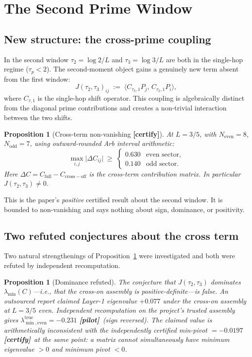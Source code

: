 \documentclass[12pt,a4paper]{amsart}
\theoremstyle{plain}
\newtheorem{proposition}[theorem]{Proposition}
\theoremstyle{definition}
\newcommand{\ltrues}[1]{\lambda_{\min,\mathrm{#1}}^{\mathrm{true}}}
\newcommand{\Jcross}{J(\tau_2,\tau_3)}
\newcommand{\certify}{\textbf{[certify]}}
\newcommand{\pilot}{\textbf{[pilot]}}
\newcommand{\ip}[2]{\langle #1,\, #2\rangle}
\begin{document}
\section{The Second Prime Window}
\label{sec:second}

\subsection{New structure: the cross-prime coupling}

In the second window $\tau_2 = \log 2/L$ and $\tau_3 = \log 3/L$ are both
in the single-hop regime ($\tau_p < 2$).  The second-moment object gains a
genuinely new term absent from the first window:
\[
  \Jcross_{ij}
  \;:=\;
  \ip{C_{\tau_3,1}P_j}{C_{\tau_2,1}P_i},
\]
where $C_{\tau,1}$ is the single-hop shift operator.  This coupling is
algebraically distinct from the diagonal prime contributions and creates
a non-trivial interaction between the two shifts.

\begin{proposition}[Cross-term non-vanishing \certify]
\label{prop:cross-nonzero}
At $L=3/5$, with $N_{\mathrm{even}}=8$, $N_{\mathrm{odd}}=7$, using
outward-rounded Arb interval arithmetic:
\[
  \max_{i,j}\lvert \Delta C_{ij}\rvert
  \;\ge\;
  \begin{cases}
    0.630 & \text{even sector},\\
    0.140 & \text{odd sector}.
  \end{cases}
\]
Here $\Delta C = C_{\mathrm{full}} - C_{\mathrm{cross-off}}$
is the cross-term contribution matrix.  In particular $\Jcross \neq 0$.
\end{proposition}

This is the paper's \emph{positive} certified result about the second window.
It is bounded to non-vanishing and says nothing about sign, dominance, or
positivity.

\subsection{Two refuted conjectures about the cross term}

Two natural strengthenings of Proposition~\ref{prop:cross-nonzero} were
investigated and both were refuted by independent recomputation.

\begin{proposition}[Dominance refuted]
\label{prop:dominance-refuted}
The conjecture that $\Jcross$ \emph{dominates} $\lambda_{\min}(C)$---i.e.,
that the cross-on assembly is positive-definite---is false.  An outsourced
report claimed Layer-1 eigenvalue $+0.077$ under the cross-on assembly at
$L=3/5$ even.  Independent recomputation on the project's trusted assembly
gives $\ltrues{even} = -0.231$ \pilot\ (sign reversed).  The claimed
value is arithmetically inconsistent with the independently certified
min-pivot $= -0.0197$ \certify\ at the same point: a matrix cannot
simultaneously have minimum eigenvalue $> 0$ and minimum pivot $< 0$.
\end{proposition}
\end{document}
